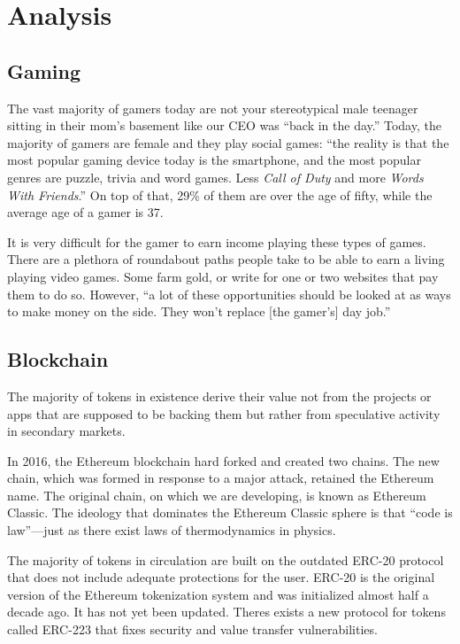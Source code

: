 \documentclass[11pt]{report}
\begin{document}
\section{Analysis}
\subsection{Gaming}
The vast majority of gamers today are not your stereotypical male teenager sitting in their mom's basement like our CEO was ``back in the day.'' Today, the majority of gamers are female and they play social games: ``the reality is that the most popular gaming device today is the smartphone, and the most popular genres are puzzle, trivia and word games. Less \textit{Call of Duty} and more \textit{Words With Friends}.''\cite{female-gamers} On top of that, 29\% of them are over the age of fifty, while the average age of a gamer is 37.\cite{average-gamer-age}

It is very difficult for the gamer to earn income playing these types of games. There are a plethora of roundabout paths people take to be able to earn a living playing video games. Some farm gold, or write for one or two websites that pay them to do so. However, ``a lot of these opportunities should be looked at as ways to make money on the side. They won’t replace [the gamer's] day job.''\cite{make-money-playing-games}
\subsection{Blockchain}
The majority of tokens in existence derive their value not from the projects or apps that are supposed to be backing them but rather from speculative activity in secondary markets.

In 2016, the Ethereum blockchain hard forked and created two chains. The new chain, which was formed in response to a major attack, retained the Ethereum name. The original chain, on which we are developing, is known as Ethereum Classic. The ideology that dominates the Ethereum Classic sphere is that ``code is law''\cite{code-is-law}---just as there exist laws of thermodynamics in physics. 

The majority of tokens in circulation are built on the outdated ERC-20 protocol that does not include adequate protections for the user. ERC-20 is the original version of the Ethereum tokenization system and was initialized almost half a decade ago. It has not yet been updated. Theres exists a new protocol for tokens called ERC-223 that fixes security and value transfer vulnerabilities.\cite{erc223}
\end{document}

